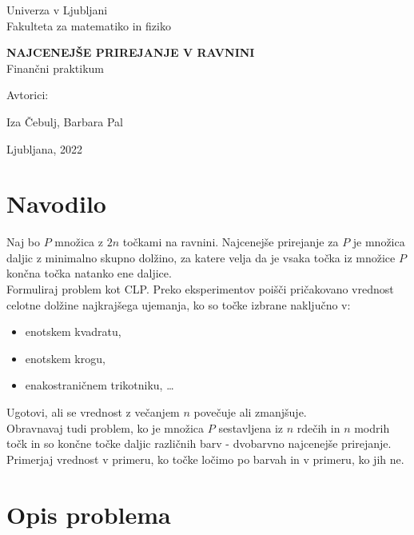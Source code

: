\documentclass[a4paper, 11pt]{article}
\begin{document}
\thispagestyle{empty}
\begin{center}
\begin{minipage}{0.75\linewidth}
    \centering
    {\Large Univerza v Ljubljani \\ Fakulteta za matematiko in fiziko}
    \\
    \vspace{7cm}

    {\uppercase{\Large \textbf{Najcenejše prirejanje v ravnini}}} \\ Finančni praktikum \\
    \vspace{3cm}

    Avtorici:\\
    {\Large Iza Čebulj, Barbara Pal\par}
    \vspace{7cm}

    {\Large Ljubljana, 2022}
\end{minipage}
\end{center}

\newpage
 
\section{Navodilo}

Naj bo $P$ množica z $2n$ točkami na ravnini. Najcenejše prirejanje za $P$ je množica daljic z minimalno skupno dolžino, za katere velja da je vsaka točka iz množice $P$ končna točka natanko ene daljice. \\
Formuliraj problem kot CLP. Preko eksperimentov poišči pričakovano vrednost celotne dolžine najkrajšega ujemanja, ko so točke izbrane naključno v:
\begin{itemize}
    \item enotskem kvadratu,
    \item enotskem krogu,
    \item enakostraničnem trikotniku, \dots
\end{itemize}
Ugotovi, ali se vrednost z večanjem $n$ povečuje ali zmanjšuje. \\
Obravnavaj tudi problem, ko je množica $P$ sestavljena iz $n$ rdečih in $n$ modrih točk in so končne točke daljic različnih barv - dvobarvno najcenejše prirejanje. 
Primerjaj vrednost v primeru, ko točke ločimo po barvah in v primeru, ko jih ne.  

\section{Opis problema}
\end{document}
